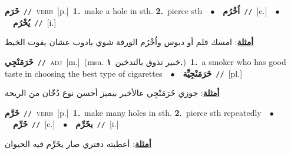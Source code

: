\documentclass[10pt,a4paper,twoside]{article} %
\begin{document}
\begin{multicols}{2}
{\setlength\topsep{0pt}\textbf{\foreignlanguage{arabic}{خَرَم}}\ {\color{gray}\texttt{//}\color{black}}\ \textsc{verb}\ [p.]\ \textbf{1.}~make a hole in sth.  \textbf{2.}~pierce sth\ \ $\bullet$\ \ \setlength\topsep{0pt}\textbf{\foreignlanguage{arabic}{اُخْرُم}}\ {\color{gray}\texttt{//}\color{black}}\ [c.]\ \ $\bullet$\ \ \setlength\topsep{0pt}\textbf{\foreignlanguage{arabic}{يُخْرُم}}\ {\color{gray}\texttt{//}\color{black}}\ [i.]\  \begin{flushright}\color{gray}\foreignlanguage{arabic}{\textbf{\underline{\foreignlanguage{arabic}{أمثلة}}}: امسك قلم أو دبوس واُخْرُم الورقة شوي يادوب عشان يفوت الخيط}\end{flushright}\color{black}} \vspace{2mm}

{\setlength\topsep{0pt}\textbf{\foreignlanguage{arabic}{خَرَمَنْجِي}}\ {\color{gray}\texttt{//}\color{black}}\ \textsc{adj}\ [m.]\ \color{gray}(msa. \foreignlanguage{arabic}{خبير تذوق بالتدخين}~\foreignlanguage{arabic}{\textbf{١.}})\color{black}\ \textbf{1.}~a smoker who has good taste in choosing the best type of cigarettes\ \ $\bullet$\ \ \setlength\topsep{0pt}\textbf{\foreignlanguage{arabic}{خَرَمَنْجِيِّة}}\ {\color{gray}\texttt{//}\color{black}}\ [pl.]\  \begin{flushright}\color{gray}\foreignlanguage{arabic}{\textbf{\underline{\foreignlanguage{arabic}{أمثلة}}}: جوزي خَرَمَنْجِي عالأخير بيميز أحسن نوع دُخّان من الريحة}\end{flushright}\color{black}} \vspace{2mm}

{\setlength\topsep{0pt}\textbf{\foreignlanguage{arabic}{خَرَّم}}\ {\color{gray}\texttt{//}\color{black}}\ \textsc{verb}\ [p.]\ \textbf{1.}~make many holes in sth.  \textbf{2.}~pierce sth repeatedly\ \ $\bullet$\ \ \setlength\topsep{0pt}\textbf{\foreignlanguage{arabic}{خَرِّم}}\ {\color{gray}\texttt{//}\color{black}}\ [c.]\ \ $\bullet$\ \ \setlength\topsep{0pt}\textbf{\foreignlanguage{arabic}{يخَرِّم}}\ {\color{gray}\texttt{//}\color{black}}\ [i.]\  \begin{flushright}\color{gray}\foreignlanguage{arabic}{\textbf{\underline{\foreignlanguage{arabic}{أمثلة}}}: أعطيته دفتري صار يخَرِّم فيه الحيوان}\end{flushright}\color{black}} \vspace{2mm}


\end{multicols}
\end{document}
